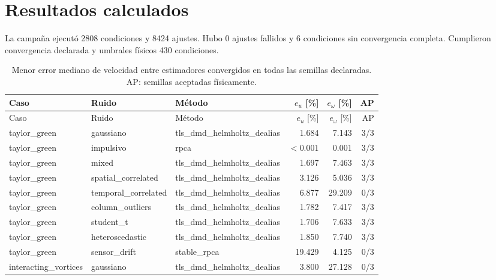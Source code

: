 \section{Resultados calculados}
La campaña ejecutó 2808 condiciones y 8424 ajustes. Hubo 0 ajustes fallidos y 6 condiciones sin convergencia completa. Cumplieron convergencia declarada y umbrales físicos 430 condiciones.
{\scriptsize\setlength{\tabcolsep}{3pt}
\begin{longtable}{p{}p{}p{}rrr}
\caption{Menor error mediano de velocidad entre estimadores convergidos en todas las semillas declaradas. AP: semillas aceptadas físicamente.}\\
\toprule Caso & Ruido & Método & $e_u$ [\%] & $e_\omega$ [\%] & AP \\\midrule\endfirsthead
\toprule Caso & Ruido & Método & $e_u$ [\%] & $e_\omega$ [\%] & AP \\\midrule\endhead
taylor\_\allowbreak green & gaussiano & tls\_\allowbreak dmd\_\allowbreak helmholtz\_\allowbreak dealias & 1.684 & 7.143 & 3/3 \\
taylor\_\allowbreak green & impulsivo & rpca & $<0.001$ & 0.001 & 3/3 \\
taylor\_\allowbreak green & mixed & tls\_\allowbreak dmd\_\allowbreak helmholtz\_\allowbreak dealias & 1.697 & 7.463 & 3/3 \\
taylor\_\allowbreak green & spatial\_\allowbreak correlated & tls\_\allowbreak dmd\_\allowbreak helmholtz\_\allowbreak dealias & 3.126 & 5.036 & 3/3 \\
taylor\_\allowbreak green & temporal\_\allowbreak correlated & tls\_\allowbreak dmd\_\allowbreak helmholtz\_\allowbreak dealias & 6.877 & 29.209 & 0/3 \\
taylor\_\allowbreak green & column\_\allowbreak outliers & tls\_\allowbreak dmd\_\allowbreak helmholtz\_\allowbreak dealias & 1.782 & 7.417 & 3/3 \\
taylor\_\allowbreak green & student\_\allowbreak t & tls\_\allowbreak dmd\_\allowbreak helmholtz\_\allowbreak dealias & 1.706 & 7.633 & 3/3 \\
taylor\_\allowbreak green & heteroscedastic & tls\_\allowbreak dmd\_\allowbreak helmholtz\_\allowbreak dealias & 1.850 & 7.740 & 3/3 \\
taylor\_\allowbreak green & sensor\_\allowbreak drift & stable\_\allowbreak rpca & 19.429 & 4.125 & 0/3 \\
interacting\_\allowbreak vortices & gaussiano & tls\_\allowbreak dmd\_\allowbreak helmholtz\_\allowbreak dealias & 3.800 & 27.128 & 0/3 \\

\end{longtable}}
